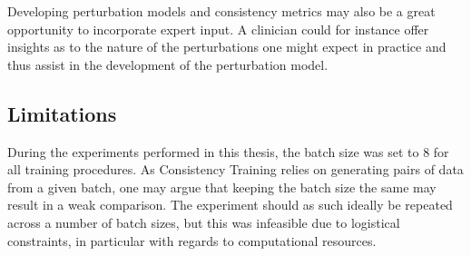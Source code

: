     Developing perturbation models and consistency metrics may also be a great opportunity to incorporate expert input. A clinician could for instance offer insights as to the nature of the perturbations one might expect in practice and thus assist in the development of the perturbation model.
    
\subsection{Limitations}
    During the experiments performed in this thesis, the batch size was set to 8 for all training procedures. As Consistency Training relies on generating pairs of data from a given batch, one may argue that keeping the batch size the same may result in a weak comparison. The experiment should as such ideally be repeated across a number of batch sizes, but this was infeasible due to logistical constraints, in particular with regards to computational resources. 

